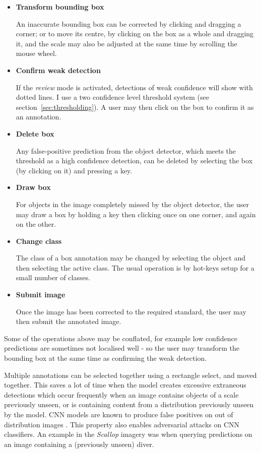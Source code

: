 \begin{itemize}
    \item {\bf Transform bounding box}\par
An inaccurate bounding box can be corrected by clicking and dragging a corner; or to move its centre, by clicking on the box as a whole and dragging it, and the scale may also be adjusted at the same time by scrolling the mouse wheel.
    \item {\bf Confirm weak detection}\par
If the \emph{review} mode is activated, detections of weak confidence will show with dotted lines. I use a two confidence level threshold system (see section~\ref{sec:thresholding}). A user may then click on the box to confirm it as an annotation.
    \item {\bf Delete box}\par
Any false-positive prediction from the object detector, which meets the threshold as a high confidence detection, can be deleted by selecting the box (by clicking on it) and pressing a key. 
    \item {\bf Draw box}\par
For objects in the image completely missed by the object detector, the user may draw a box by holding a key then clicking once on one corner, and again on the other.
    \item {\bf Change class}\par
The class of a box annotation may be changed by selecting the object and then selecting the active class. The usual operation is by hot-keys setup for a small number of classes.
    \item {\bf Submit image}\par
Once the image has been corrected to the required standard, the user may then submit the annotated image.
\end{itemize}

Some of the operations above may be conflated, for example low confidence predictions are sometimes not localised well - so the user may transform the bounding box at the same time as confirming the weak detection.


Multiple annotations can be selected together using a rectangle select, and moved together.  This saves a lot of time when the model creates excessive extraneous detections which occur frequently when an image contains objects of a scale previously unseen, or is containing content from a distribution previously unseen by the model. \gls{CNN} models are known to produce false positives on out of distribution images \cite{Hendrycks2016,Lee2018}. This property also enables adversarial attacks on \gls{CNN} classifiers. An example in the \emph{Scallop} imagery was when querying predictions on an image containing a (previously unseen) diver.



